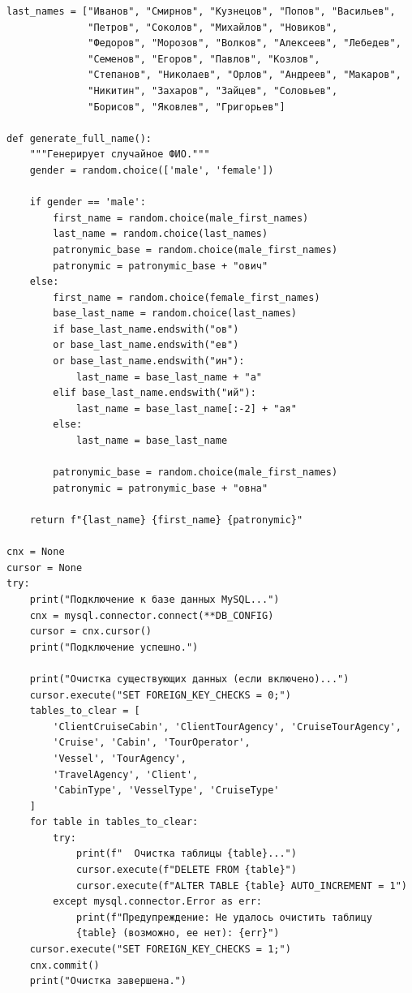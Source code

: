 \documentclass[11pt,a4paper,final]{article}
\begin{document}
{\begin{verbatim}
last_names = ["Иванов", "Смирнов", "Кузнецов", "Попов", "Васильев",
              "Петров", "Соколов", "Михайлов", "Новиков",
              "Федоров", "Морозов", "Волков", "Алексеев", "Лебедев",
              "Семенов", "Егоров", "Павлов", "Козлов",
              "Степанов", "Николаев", "Орлов", "Андреев", "Макаров", 
              "Никитин", "Захаров", "Зайцев", "Соловьев",
              "Борисов", "Яковлев", "Григорьев"]

def generate_full_name():
    """Генерирует случайное ФИО."""
    gender = random.choice(['male', 'female'])

    if gender == 'male':
        first_name = random.choice(male_first_names)
        last_name = random.choice(last_names)
        patronymic_base = random.choice(male_first_names)
        patronymic = patronymic_base + "ович"
    else:
        first_name = random.choice(female_first_names)
        base_last_name = random.choice(last_names)
        if base_last_name.endswith("ов") 
        or base_last_name.endswith("ев")
        or base_last_name.endswith("ин"):
            last_name = base_last_name + "а"
        elif base_last_name.endswith("ий"):
            last_name = base_last_name[:-2] + "ая"
        else:
            last_name = base_last_name

        patronymic_base = random.choice(male_first_names)
        patronymic = patronymic_base + "овна"

    return f"{last_name} {first_name} {patronymic}"

cnx = None
cursor = None
try:
    print("Подключение к базе данных MySQL...")
    cnx = mysql.connector.connect(**DB_CONFIG)
    cursor = cnx.cursor()
    print("Подключение успешно.")

    print("Очистка существующих данных (если включено)...")
    cursor.execute("SET FOREIGN_KEY_CHECKS = 0;")
    tables_to_clear = [
        'ClientCruiseCabin', 'ClientTourAgency', 'CruiseTourAgency',
        'Cruise', 'Cabin', 'TourOperator',
        'Vessel', 'TourAgency',
        'TravelAgency', 'Client',
        'CabinType', 'VesselType', 'CruiseType'
    ]
    for table in tables_to_clear:
        try:
            print(f"  Очистка таблицы {table}...")
            cursor.execute(f"DELETE FROM {table}")
            cursor.execute(f"ALTER TABLE {table} AUTO_INCREMENT = 1")
        except mysql.connector.Error as err:
            print(f"Предупреждение: Не удалось очистить таблицу 
            {table} (возможно, ее нет): {err}")
    cursor.execute("SET FOREIGN_KEY_CHECKS = 1;")
    cnx.commit()
    print("Очистка завершена.")


\end{verbatim}}
\end{document}
